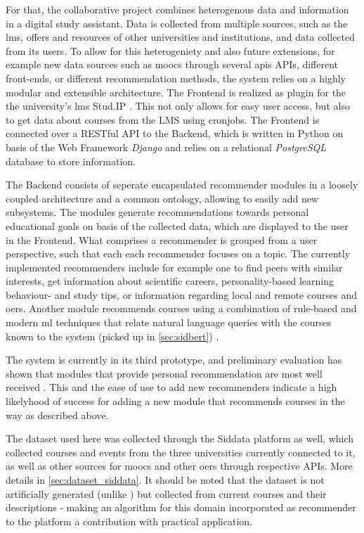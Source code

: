 For that, the collaborative project combines heterogenous data and information in a digital study assistant. Data is collected from multiple sources, such as the \gls{lms}, offers and resources of other universities and institutions, and data collected from its users. To allow for this heterogeniety and also future extensions, for example new data sources  such as \glspl{mooc} through several apis APIs, different front-ends, or different recommendation methods, the system relies on a highly modular and extensible architecture. The Frontend is realized as plugin for the  the university's \gls{lms} Stud.IP \cite{stockmann2005}. This not only allows for easy user access, but also to get data about courses from the LMS using cronjobs. The Frontend is connected over a RESTful API to the Backend, which is written in Python on basis of the Web Framework \textit{Django} and relies on a relational \textit{PostgreSQL} database to store information.

The Backend consists of seperate encapsulated recommender modules in a loosely coupled architecture and a common ontology, allowing to easily add new subsystems. The modules generate recommendations towards personal educational goals on basis of the collected data, which are displayed to the user in the Frontend. What comprises a recommender is grouped from a user perspective, such that each each recommender focuses on a topic. The currently implemented recommenders include for example one to find peers with similar interests, get information about scientific careers, personality-based learning behaviour- and study tips, or information regarding local and remote courses and \glspl{oer}. Another module recommends courses using a combination of rule-based and modern \gls{ml} techniques that relate natural language queries with the courses known to the system (picked up in \autoref{sec:sidbert}) \cite{Schurz2021}.

The system is currently in its third prototype, and preliminary evaluation has shown that modules that provide personal recommendation are most well received \cite{Schurz2021}. This and the ease of use to add new recommenders indicate a high likelyhood of success for adding a new module that recommends courses in the way as described above.

The dataset used here was collected through the Siddata platform as well, which collected courses and events from the three universities currently connected to it, as well as other sources for \glspl{mooc} and other \glspl{oer} through respective APIs. More details in \autoref{sec:dataset_siddata}. It should be noted that the dataset is not artificially generated (unlike \mainalgos) but collected from current courses and their descriptions - making an algorithm for this domain incorporated as recommender to the platform a contribution with practical application.



